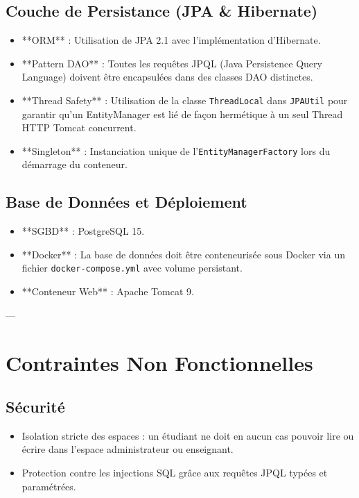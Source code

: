 \documentclass[12pt,a4paper]{article}
\begin{document}
\subsection{Couche de Persistance (JPA \& Hibernate)}
\begin{itemize}
    \item **ORM** : Utilisation de JPA 2.1 avec l'implémentation d'Hibernate.
    \item **Pattern DAO** : Toutes les requêtes JPQL (Java Persistence Query Language) doivent être encapsulées dans des classes DAO distinctes.
    \item **Thread Safety** : Utilisation de la classe \texttt{ThreadLocal} dans \texttt{JPAUtil} pour garantir qu'un EntityManager est lié de façon hermétique à un seul Thread HTTP Tomcat concurrent.
    \item **Singleton** : Instanciation unique de l'\texttt{EntityManagerFactory} lors du démarrage du conteneur.
\end{itemize}

\subsection{Base de Données et Déploiement}
\begin{itemize}
    \item **SGBD** : PostgreSQL 15.
    \item **Docker** : La base de données doit être conteneurisée sous Docker via un fichier \texttt{docker-compose.yml} avec volume persistant.
    \item **Conteneur Web** : Apache Tomcat 9.
\end{itemize}

---

\section{Contraintes Non Fonctionnelles}

\subsection{Sécurité}
\begin{itemize}
    \item Isolation stricte des espaces : un étudiant ne doit en aucun cas pouvoir lire ou écrire dans l'espace administrateur ou enseignant.
    \item Protection contre les injections SQL grâce aux requêtes JPQL typées et paramétrées.
\end{itemize}
\end{document}
